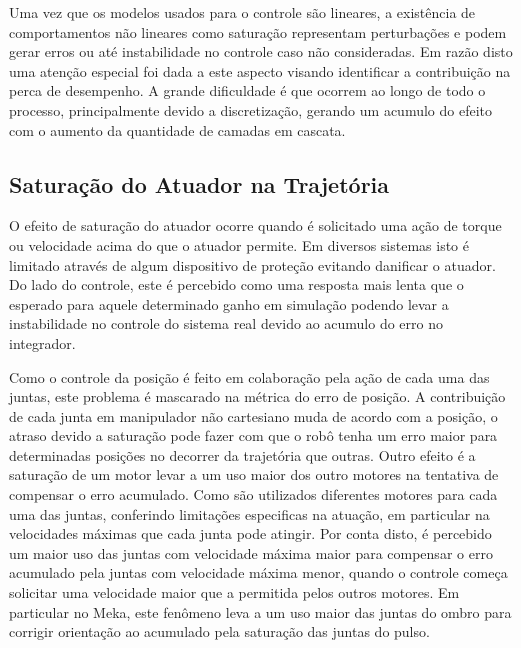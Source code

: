 

Uma vez que os modelos usados para o controle são lineares, a existência de comportamentos não lineares como saturação representam perturbações e podem gerar erros ou até instabilidade no controle caso não consideradas. Em razão disto uma atenção especial foi dada a este aspecto visando identificar a contribuição na perca de desempenho. A grande dificuldade é que ocorrem ao longo de todo o processo, principalmente devido a discretização, gerando um acumulo do efeito com o aumento da quantidade de camadas em cascata.

\subsection{Saturação do Atuador na Trajetória}

O efeito de saturação do atuador ocorre quando é solicitado uma ação de torque ou velocidade acima do que o atuador permite. Em diversos sistemas isto é limitado através de algum dispositivo de proteção evitando danificar o atuador. Do lado do controle, este é percebido como uma resposta mais lenta que o esperado para aquele determinado ganho em simulação podendo levar a instabilidade no controle do sistema real devido ao acumulo do erro no integrador.

Como o controle da posição é feito em colaboração pela ação de cada uma das juntas, este problema é mascarado na métrica do erro de posição. A contribuição de cada junta em manipulador não cartesiano muda de acordo com a posição, o atraso devido a saturação pode fazer com que o robô tenha um erro maior para determinadas posições no decorrer da trajetória que outras. Outro efeito é a saturação de um motor levar a um uso maior dos outro motores na tentativa de compensar o erro acumulado. Como são utilizados diferentes motores para cada uma das juntas, conferindo limitações especificas na atuação, em particular na velocidades máximas que cada junta pode atingir. Por conta disto, é percebido um maior uso das juntas com velocidade máxima maior para compensar o erro acumulado pela juntas com velocidade máxima menor, quando o controle começa solicitar uma velocidade maior que a permitida pelos outros motores. Em particular no Meka, este fenômeno leva a um uso maior das juntas do ombro para corrigir orientação ao acumulado pela saturação das juntas do pulso.

